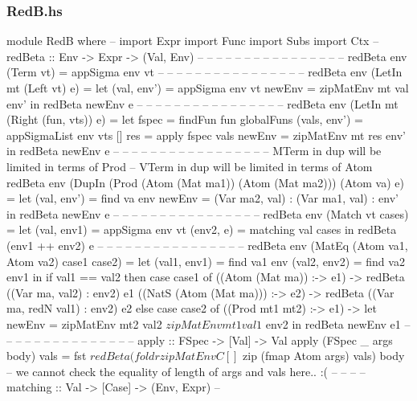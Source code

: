 \subsubsection*{RedB.hs}
\begin{framed}
\begin{code}
    module RedB where
    --
    import Expr
    import Func
    import Subs
    import Ctx
    --
    redBeta :: Env -> Expr -> (Val, Env)
    -- -- -- -- -- -- -- -- -- -- -- -- -- -- -- --
    redBeta env (Term vt) =
        appSigma env vt
    -- -- -- -- -- -- -- -- -- -- -- -- -- -- -- --
    redBeta env (LetIn mt (Left vt) e) =
        let (val, env') = appSigma env vt
            newEnv = zipMatEnv mt val env'
        in redBeta newEnv e
    -- -- -- -- -- -- -- -- -- -- -- -- -- -- -- --
    redBeta env (LetIn mt (Right (fun, vts)) e) =
        let fspec = findFun fun globalFuns
            (vals, env') = appSigmaList env vts []
            res = apply fspec vals
            newEnv = zipMatEnv mt res env'
        in redBeta newEnv e
    -- -- -- -- -- -- -- -- -- -- -- -- -- -- -- --
    -- MTerm in dup will be limited in terms of Prod
    -- VTerm in dup will be limited in terms of Atom
    redBeta env (DupIn (Prod (Atom (Mat ma1)) (Atom (Mat ma2))) (Atom va) e) =
            let (val, env') = find va env
                newEnv = (Var ma2, val) : (Var ma1, val) : env'
            in redBeta newEnv e
    -- -- -- -- -- -- -- -- -- -- -- -- -- -- -- --
    redBeta env (Match vt cases) =
        let (val, env1) = appSigma env vt
            (env2, e) = matching val cases
        in redBeta (env1 ++ env2) e
    -- -- -- -- -- -- -- -- -- -- -- -- -- -- -- --
    redBeta env (MatEq (Atom va1, Atom va2) case1 case2) =
        let (val1, env1) = find va1 env
            (val2, env2) = find va2 env1
        in if val1 == val2
            then case case1 of
                ((Atom (Mat ma)) :-> e1) -> redBeta ((Var ma, val2) : env2) e1
                ((NatS (Atom (Mat ma))) :-> e2) ->
                    redBeta ((Var ma, redN val1) : env2) e2
            else case case2 of
                ((Prod mt1 mt2) :-> e1) ->
                    let newEnv = zipMatEnv mt2 val2 $ zipMatEnv mt1 val1 $ env2
                    in redBeta newEnv e1
    -- -- -- -- -- -- -- -- -- -- -- -- -- -- --
    apply :: FSpec -> [Val] -> Val
    apply (FSpec _ args body) vals =
        fst $ redBeta (foldr zipMatEnvC [] $ zip (fmap Atom args) vals) body
        -- we cannot check the equality of length of args and vals here.. :(
    -- -- -- --
    matching :: Val -> [Case] -> (Env, Expr)
    --

\end{code}
\end{framed}
